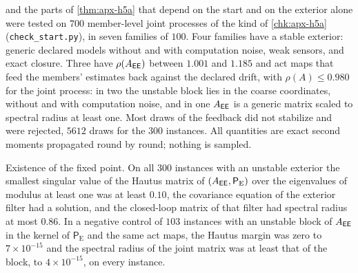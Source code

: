 \begin{numcheck}\label{chk:apx-start}
 and the parts of \cref{thm:apx-h5a} that depend on the start and on the exterior alone were tested on $700$ member-level joint processes of the kind of \cref{chk:apx-h5a} (\texttt{check\_start.py}), in seven families of $100$. Four families have a stable exterior: generic declared models without and with computation noise, weak sensors, and exact closure. Three have $\rho(A_{\mathsf{E}\mathsf{E}})$ between $1.001$ and $1.185$ and act maps that feed the members' estimates back against the declared drift, with $\rho(A)\le0.980$ for the joint process: in two the unstable block lies in the coarse coordinates, without and with computation noise, and in one $A_{\mathsf{E}\mathsf{E}}$ is a generic matrix scaled to spectral radius at least one. Most draws of the feedback did not stabilize and were rejected, $5612$ draws for the $300$ instances. All quantities are exact second moments propagated round by round; nothing is sampled.

Existence of the fixed point. On all $300$ instances with an unstable exterior the smallest singular value of the Hautus matrix of $(A_{\mathsf{E}\mathsf{E}},\mathsf P_{\mathrm E})$ over the eigenvalues of modulus at least one was at least $0.10$, the covariance equation of the exterior filter had a solution, and the closed-loop matrix of that filter had spectral radius at most $0.86$. In a negative control of $103$ instances with an unstable block of $A_{\mathsf{E}\mathsf{E}}$ in the kernel of $\mathsf P_{\mathrm E}$ and the same act maps, the Hautus margin was zero to $7\times10^{-15}$ and the spectral radius of the joint matrix was at least that of the block, to $4\times10^{-15}$, on every instance.


\end{numcheck}
